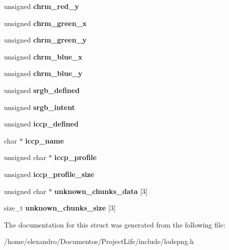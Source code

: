\begin{DoxyCompactItemize}
\mbox{\label{struct_lode_p_n_g_info_a39824e3bce473eb8a9a27c8075fc407d}} 
unsigned {\bfseries chrm\+\_\+red\+\_\+y}
\item 
\mbox{\label{struct_lode_p_n_g_info_afcfedb61356a1c9b328e4098f03216af}} 
unsigned {\bfseries chrm\+\_\+green\+\_\+x}
\item 
\mbox{\label{struct_lode_p_n_g_info_adecaa88e64ed563ad05acd66a36d9a55}} 
unsigned {\bfseries chrm\+\_\+green\+\_\+y}
\item 
\mbox{\label{struct_lode_p_n_g_info_a7394fc7407c168180b2cf64896fbe7fc}} 
unsigned {\bfseries chrm\+\_\+blue\+\_\+x}
\item 
\mbox{\label{struct_lode_p_n_g_info_a9e6af4de8972b039ecb137fb32167505}} 
unsigned {\bfseries chrm\+\_\+blue\+\_\+y}
\item 
\mbox{\label{struct_lode_p_n_g_info_a3a0795a8ec1ddcaac245ba3337054e46}} 
unsigned {\bfseries srgb\+\_\+defined}
\item 
\mbox{\label{struct_lode_p_n_g_info_a35a37c55a3b6c5ff3d064dd26531c72b}} 
unsigned {\bfseries srgb\+\_\+intent}
\item 
\mbox{\label{struct_lode_p_n_g_info_a6304883960715cbcebf45a05c40d5b53}} 
unsigned {\bfseries iccp\+\_\+defined}
\item 
\mbox{\label{struct_lode_p_n_g_info_a0e139ec8c88c920bedb602090a3546d0}} 
char $\ast$ {\bfseries iccp\+\_\+name}
\item 
\mbox{\label{struct_lode_p_n_g_info_a4400b67420e9c225881901bb48eda9b2}} 
unsigned char $\ast$ {\bfseries iccp\+\_\+profile}
\item 
\mbox{\label{struct_lode_p_n_g_info_a11eaae6ecbb308ac1e70dcd10fee6891}} 
unsigned {\bfseries iccp\+\_\+profile\+\_\+size}
\item 
\mbox{\label{struct_lode_p_n_g_info_a8347476da7fc2fc6af4ec7ed44b638c6}} 
unsigned char $\ast$ {\bfseries unknown\+\_\+chunks\+\_\+data} [3]
\item 
\mbox{\label{struct_lode_p_n_g_info_a25a81d760759bd0383ae5a81ba83911d}} 
size\+\_\+t {\bfseries unknown\+\_\+chunks\+\_\+size} [3]
\end{DoxyCompactItemize}


The documentation for this struct was generated from the following file\+:\begin{DoxyCompactItemize}
\item 
/home/elexandro/\+Documentos/\+Project\+Life/include/lodepng.\+h\end{DoxyCompactItemize}
